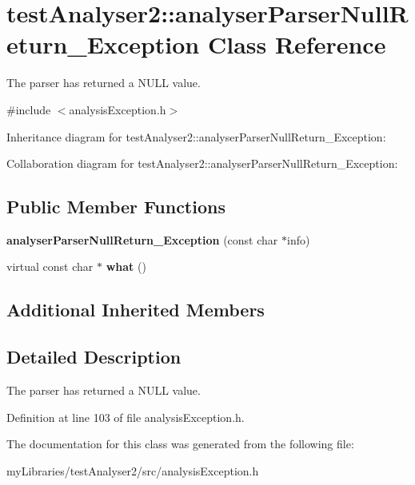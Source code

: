\hypertarget{classtestAnalyser2_1_1analyserParserNullReturn__Exception}{}\section{test\+Analyser2\+::analyser\+Parser\+Null\+Return\+\_\+\+Exception Class Reference}
\label{classtestAnalyser2_1_1analyserParserNullReturn__Exception}


The parser has returned a N\+U\+LL value.  




{\ttfamily \#include $<$analysis\+Exception.\+h$>$}



Inheritance diagram for test\+Analyser2\+::analyser\+Parser\+Null\+Return\+\_\+\+Exception\+:


Collaboration diagram for test\+Analyser2\+::analyser\+Parser\+Null\+Return\+\_\+\+Exception\+:
\subsection*{Public Member Functions}
\begin{DoxyCompactItemize}
\item 
\mbox{\label{classtestAnalyser2_1_1analyserParserNullReturn__Exception_a484378847c4d2b8c1b4c7e5c739ccb16}} 
{\bfseries analyser\+Parser\+Null\+Return\+\_\+\+Exception} (const char $\ast$info)
\item 
\mbox{\label{classtestAnalyser2_1_1analyserParserNullReturn__Exception_ab539bd9f3f867435affa0f8c91e32cf0}} 
virtual const char $\ast$ {\bfseries what} ()
\end{DoxyCompactItemize}
\subsection*{Additional Inherited Members}


\subsection{Detailed Description}
The parser has returned a N\+U\+LL value. 

Definition at line 103 of file analysis\+Exception.\+h.



The documentation for this class was generated from the following file\+:\begin{DoxyCompactItemize}
\item 
my\+Libraries/test\+Analyser2/src/analysis\+Exception.\+h\end{DoxyCompactItemize}
